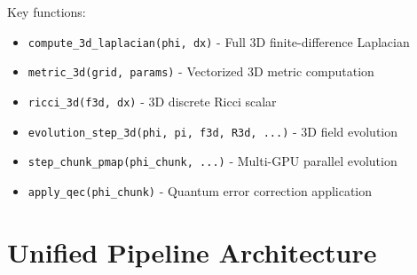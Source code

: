 \documentclass[11pt]{article}
\begin{document}
Key functions:
\begin{itemize}
\item \texttt{compute\_3d\_laplacian(phi, dx)} - Full 3D finite-difference Laplacian
\item \texttt{metric\_3d(grid, params)} - Vectorized 3D metric computation
\item \texttt{ricci\_3d(f3d, dx)} - 3D discrete Ricci scalar
\item \texttt{evolution\_step\_3d(phi, pi, f3d, R3d, ...)} - 3D field evolution
\item \texttt{step\_chunk\_pmap(phi\_chunk, ...)} - Multi-GPU parallel evolution
\item \texttt{apply\_qec(phi\_chunk)} - Quantum error correction application
\end{itemize}

\section{Unified Pipeline Architecture}
\end{document}
